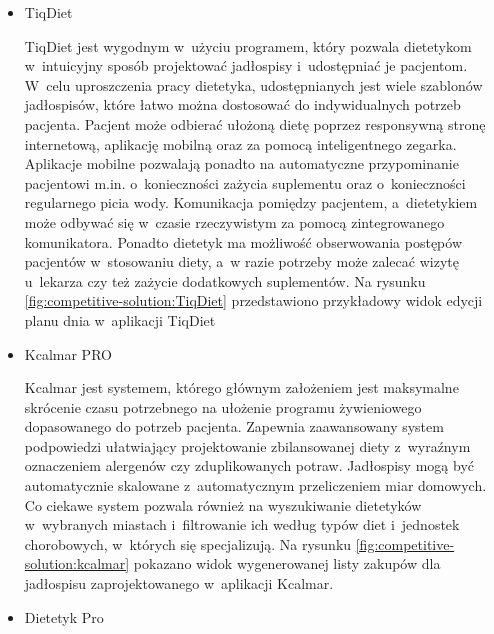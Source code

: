 \begin{itemize}
    \item TiqDiet

        TiqDiet\cite{url:TiqDiet} jest wygodnym w~użyciu programem, który pozwala dietetykom w~intuicyjny sposób projektować jadłospisy i~udostępniać je pacjentom.
        W~celu uproszczenia pracy dietetyka, udostępnianych jest wiele szablonów jadłospisów, które łatwo można dostosować do indywidualnych potrzeb pacjenta.
        Pacjent może odbierać ułożoną dietę poprzez responsywną stronę internetową, aplikację mobilną oraz za pomocą inteligentnego zegarka.
        Aplikacje mobilne pozwalają ponadto na automatyczne przypominanie pacjentowi m.in. o~konieczności zażycia suplementu oraz o~konieczności regularnego picia wody.
        Komunikacja pomiędzy pacjentem, a~dietetykiem może odbywać się w~czasie rzeczywistym za pomocą zintegrowanego komunikatora.
        Ponadto dietetyk ma możliwość obserwowania postępów pacjentów w~stosowaniu diety, a~w razie potrzeby może zalecać wizytę u~lekarza czy też zażycie dodatkowych suplementów.
        Na rysunku \ref{fig:competitive-solution:TiqDiet} przedstawiono przykładowy widok edycji planu dnia w~aplikacji TiqDiet


    \item Kcalmar PRO

        Kcalmar\cite{url:kcalmar} jest systemem, którego głównym założeniem jest maksymalne skrócenie czasu potrzebnego na ułożenie programu żywieniowego dopasowanego do potrzeb pacjenta.
        Zapewnia zaawansowany system podpowiedzi ułatwiający projektowanie zbilansowanej diety z~wyraźnym oznaczeniem alergenów czy zduplikowanych potraw.
        Jadłospisy mogą być automatycznie skalowane z~automatycznym przeliczeniem miar domowych.
        Co ciekawe system pozwala również na wyszukiwanie dietetyków w~wybranych miastach i~filtrowanie ich według typów diet i~jednostek chorobowych, w~których się specjalizują.
        Na rysunku \ref{fig:competitive-solution:kcalmar} pokazano widok wygenerowanej listy zakupów dla jadłospisu zaprojektowanego w~aplikacji Kcalmar.


    \item Dietetyk Pro


\end{itemize}
